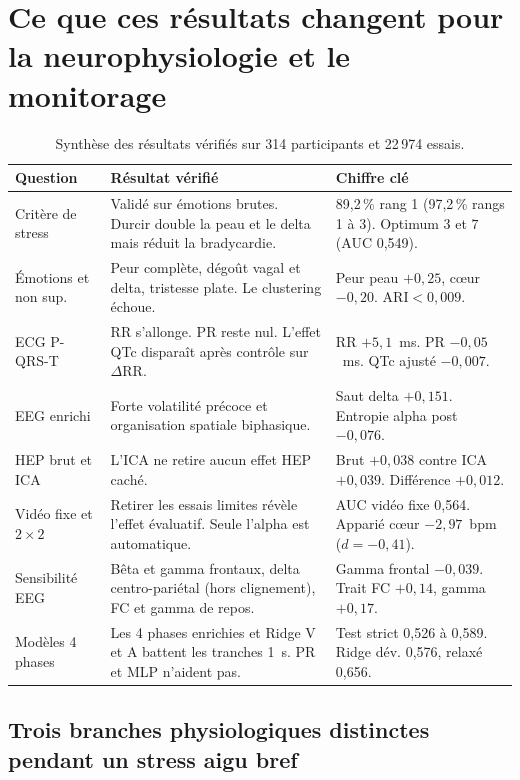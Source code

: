 \documentclass[10pt]{article}
\begin{document}
\section{Ce que ces résultats changent pour la neurophysiologie et le monitorage}

\begin{table}[t]
\centering\footnotesize
\begin{tabularx}{\linewidth}{@{}L{2.55cm} Y L{4.7cm}@{}}
\toprule
Question & Résultat vérifié & Chiffre clé\\
\midrule
Critère de stress & Validé sur émotions brutes. Durcir double la peau et le delta mais réduit la bradycardie. & 89,2\,\% rang 1 (97,2\,\% rangs 1 à 3). Optimum $3$ et $7$ (AUC 0,549).\\
Émotions et non sup. & Peur complète, dégoût vagal et delta, tristesse plate. Le clustering échoue. & Peur peau $+0{,}25$, cœur $-0{,}20$. $\mathrm{ARI} < 0{,}009$.\\
ECG P-QRS-T & RR s'allonge. PR reste nul. L'effet QTc disparaît après contrôle sur $\Delta\mathrm{RR}$. & RR $+5{,}1$~ms. PR $-0{,}05$~ms. QTc ajusté $-0{,}007$.\\
EEG enrichi & Forte volatilité précoce et organisation spatiale biphasique. & Saut delta $+0{,}151$. Entropie alpha post $-0{,}076$.\\
HEP brut et ICA & L'ICA ne retire aucun effet HEP caché. & Brut $+0{,}038$ contre ICA $+0{,}039$. Différence $+0{,}012$.\\
Vidéo fixe et $2\times 2$ & Retirer les essais limites révèle l'effet évaluatif. Seule l'alpha est automatique. & AUC vidéo fixe 0,564. Apparié cœur $-2{,}97$~bpm ($d = -0{,}41$).\\
Sensibilité EEG & Bêta et gamma frontaux, delta centro-pariétal (hors clignement), FC et gamma de repos. & Gamma frontal $-0{,}039$. Trait FC $+0{,}14$, gamma $+0{,}17$.\\
Modèles 4 phases & Les 4 phases enrichies et Ridge V et A battent les tranches 1~s. PR et MLP n'aident pas. & Test strict 0,526 à 0,589. Ridge dév. 0,576, relaxé 0,656.\\
\bottomrule
\end{tabularx}
\caption{Synthèse des résultats vérifiés sur 314 participants et 22\,974 essais.}
\label{tab:summary}
\end{table}

\subsection{Trois branches physiologiques distinctes pendant un stress aigu bref}
\end{document}
